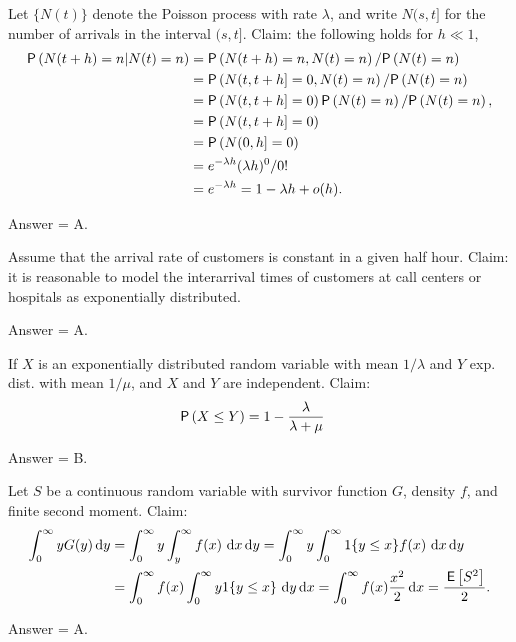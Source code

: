 \begin{exercise}[201807]
Let $\{N(t)\}$ denote the Poisson process with rate $\lambda$, and write $N(s, t]$ for the number of arrivals in the interval $(s,t]$. Claim: the following holds for $h\ll 1$, 
 \begin{align*}
 \P{N(t+h) = n | N(t) = n} 
&= \P{N(t+h) = n, N(t) = n}/\P{N(t)=n} \\
&= \P{N(t, t+h] = 0, N(t) = n}/\P{N(t)=n} \\
&= \P{N(t, t+h] = 0} \P{N(t) = n}/\P{N(t)=n}, \\
&= \P{N(t, t+h] = 0} \\
&= \P{N(0, h] = 0} \\
&= e^{-\lambda h} (\lambda h)^0/0! \\
&= e^{-\lambda h} = 1-\lambda h + o(h).
 \end{align*}
\begin{solution}
Answer = A.
\end{solution}
\end{exercise}



\begin{exercise}[201807]
Assume that the arrival rate of customers is constant in a given half hour. Claim: it is reasonable to model the interarrival times of customers at call centers or hospitals as exponentially distributed.
\begin{solution}
Answer = A.
\end{solution}
\end{exercise}

\begin{exercise}[201807]
If $X$ is an exponentially distributed random variable with mean $1/\lambda$ and $Y$ exp. dist. with mean $1/\mu$, and $X$ and $Y$ are independent. Claim:
\begin{align*}
 \P{X\leq Y} 
&= 1 - \frac{\lambda}{\lambda + \mu} 
\end{align*}

\begin{solution}
Answer = B.
\end{solution}
\end{exercise}

\begin{exercise}[201807]
Let $S$ be a continuous random variable with survivor function $G$, density $f$, and finite second moment. Claim:
 \begin{align*}
\int_0^\infty y G(y) \,\text{d}y 
&= \int_0^\infty y \int_y^\infty f(x)\, \,\text{d}x \,\text{d}y = \int_0^\infty y \int_0^\infty 1\{y\leq x\}f(x)\, \,\text{d}x \,\text{d}y\\
&= \int_0^\infty f(x) \int_0^\infty y 1\{y \leq x\}\, \,\text{d}y \,\text{d}x
= \int_0^\infty f(x) \frac{x^2}2 \,\text{d}x =\frac{\,\mathsf{E}\left[S^2\right]}2.
 \end{align*}

\begin{solution}
Answer = A.
\end{solution}
\end{exercise}




